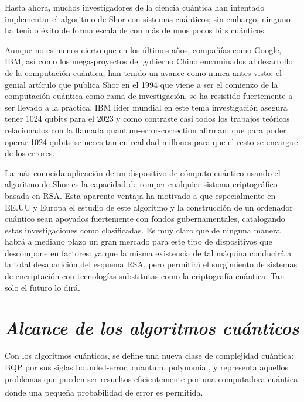 \documentclass[a4paper,11pt]{article}
\begin{document}
\par Hasta ahora, muchos investigadores de la ciencia cuántica han intentado implementar el algoritmo de Shor con sistemas cuánticos; sin embargo, ninguno ha tenido éxito de forma escalable con más de unos pocos bits cuánticos.

\par Aunque no es menos cierto que en los últimos años, compañías como Google, IBM, así como los mega-proyectos del gobierno Chino encaminados al desarrollo de la computación cuántica; han tenido un avance como nunca antes visto; el genial artículo que publica Shor en el 1994 que viene a ser el comienzo de la computación cuántica como rama de investigación, se ha resistido fuertemente a ser llevado a la práctica. IBM líder mundial en este tema investigación asegura tener 1024 qubits para el 2023 y como contraste casi todos los trabajos teóricos relacionados con la llamada quantum-error-correction afirman: que para poder operar 1024 qubits se necesitan en realidad millones para que el resto se encargue de los errores.\\

\par La más conocida aplicación de un dispositivo de cómputo cuántico usando el algoritmo de Shor es la capacidad de romper cualquier sistema criptográfico basada en RSA. Esta aparente ventaja ha motivado a que especialmente en EE.UU y Europa el estudio de este algoritmo y la construcción de un ordenador cuántico sean apoyados
fuertemente con fondos gubernamentales, catalogando estas investigaciones como clasificadas. Es muy claro que de ninguna manera habrá a mediano plazo un gran mercado para este tipo de dispositivos que descompone en factores: ya que la misma existencia de tal máquina conducirá a la total desaparición del esquema RSA, pero permitirá el surgimiento de sistemas de encriptación con tecnologías substitutas como la criptografía cuántica. Tan solo el futuro lo dirá.

\section*{\center\itshape\large Alcance de los algoritmos cuánticos}

\par Con los algoritmos cuánticos, se define una nueva clase de complejidad cu\'antica: BQP por sus siglas bounded-error, quantum, polynomial, y representa aquellos problemas que pueden ser resueltos eficientemente por una computadora cu\'antica donde una peque\~na probabilidad de error es permitida\textsuperscript{\textcolor{cyan}{\cite{3}}}.
\end{document}
